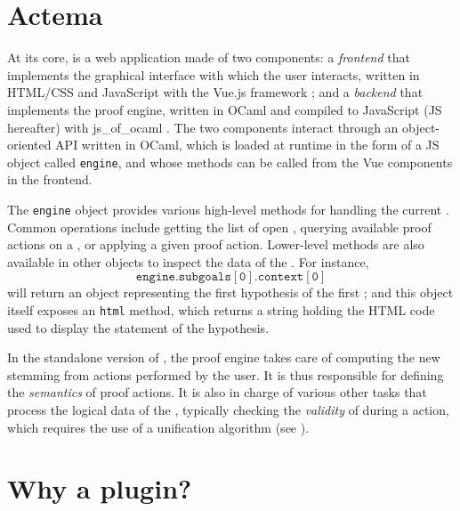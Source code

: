 \section{Actema}

At its core,  is a web application made of two components: a
\emph{frontend} that implements the graphical interface with which the user
interacts, written in HTML/CSS and JavaScript with the Vue.js framework
; and a \emph{backend} that implements the proof engine, written in
OCaml and compiled to JavaScript (JS hereafter) with js\_of\_ocaml
. The two components interact through an
object-oriented API written in OCaml, which is loaded at runtime in the form of
a JS object called \texttt{engine}, and whose methods can be called from the Vue
components in the frontend.

The \texttt{engine} object provides various high-level methods for handling the
current \emph{}. Common operations include getting the list of open
, querying available proof actions on a , or applying a given
proof action. Lower-level methods are also available in other objects to inspect
the data of the . For instance,
$$\mathtt{engine.subgoals[0].context[0]}$$
will return an object representing the first hypothesis of the first ;
and this object itself exposes an \texttt{html} method, which returns a string
holding the HTML code used to display the statement of the hypothesis.


In the standalone version of , the proof engine takes care of computing
the new  stemming from actions performed by the user. It is thus
responsible for defining the \emph{semantics} of proof actions. It is also in
charge of various other tasks that process the logical data of the ,
typically checking the \emph{validity} of  during a  action, which
requires the use of a unification algorithm (see ).

\section{Why a plugin?}

